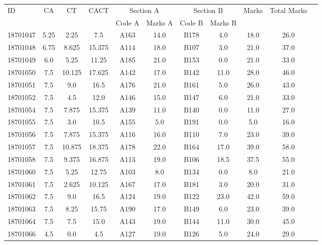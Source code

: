 \documentclass[12pt]{article}
\begin{document}
    \begin{center} 
	\renewcommand{\arraystretch}{1.08}
	\begin{small}
    \begin{tabular}{|l|c|c|c|c|c|c|c|c|c|c|} \hline
	\multirow{2}{*}{ID} & 	\multirow{2}{*}{CA}  & 	\multirow{2}{*}{CT}  & 	\multirow{2}{*}{CACT}  & \multicolumn{2 }{c|}{Section A}& \multicolumn{2 }{c|}{Section B} & 	\multirow{2}{*}{Marks}  & 	\multirow{2}{*}{Total Marks}  \\ 
	&  &  &  & Code A & Marks A & Code B & Marks B&  &  \\ \hline
18701047 & 5.25 & 2.25 & 7.5 & A163 & 14.0 & B178 & 4.0 & 18.0 & 26.0\\ \hline 
18701048 & 6.75 & 8.625 & 15.375 & A114 & 18.0 & B107 & 3.0 & 21.0 & 37.0\\ \hline 
18701049 & 6.0 & 5.25 & 11.25 & A185 & 21.0 & B153 & 0.0 & 21.0 & 33.0\\ \hline 
18701050 & 7.5 & 10.125 & 17.625 & A142 & 17.0 & B142 & 11.0 & 28.0 & 46.0\\ \hline 
18701051 & 7.5 & 9.0 & 16.5 & A176 & 21.0 & B161 & 5.0 & 26.0 & 43.0\\ \hline 
18701052 & 7.5 & 4.5 & 12.0 & A146 & 15.0 & B147 & 6.0 & 21.0 & 33.0\\ \hline 
18701054 & 7.5 & 7.875 & 15.375 & A139 & 11.0 & B140 & 0.0 & 11.0 & 27.0\\ \hline 
18701055 & 7.5 & 3.0 & 10.5 & A155 & 5.0 & B191 & 0.0 & 5.0 & 16.0\\ \hline 
18701056 & 7.5 & 7.875 & 15.375 & A116 & 16.0 & B110 & 7.0 & 23.0 & 39.0\\ \hline 
18701057 & 7.5 & 10.875 & 18.375 & A178 & 22.0 & B164 & 17.0 & 39.0 & 58.0\\ \hline 
18701058 & 7.5 & 9.375 & 16.875 & A113 & 19.0 & B106 & 18.5 & 37.5 & 55.0\\ \hline 
18701060 & 7.5 & 5.25 & 12.75 & A103 & 8.0 & B134 & 0.0 & 8.0 & 21.0\\ \hline 
18701061 & 7.5 & 2.625 & 10.125 & A167 & 17.0 & B181 & 3.0 & 20.0 & 31.0\\ \hline 
18701062 & 7.5 & 9.0 & 16.5 & A124 & 19.0 & B122 & 23.0 & 42.0 & 59.0\\ \hline 
18701063 & 7.5 & 8.25 & 15.75 & A190 & 17.0 & B149 & 6.0 & 23.0 & 39.0\\ \hline 
18701064 & 7.5 & 7.5 & 15.0 & A143 & 19.0 & B144 & 11.0 & 30.0 & 45.0\\ \hline 
18701066 & 4.5 & 0.0 & 4.5 & A127 & 19.0 & B126 & 5.0 & 24.0 & 29.0\\ \hline 

\end{tabular}
\end{small}
\end{center}
\end{document}
